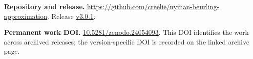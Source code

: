 \par\textbf{Repository and release.} \url{https://github.com/creelie/nyman-beurling-approximation}. Release \href{https://github.com/creelie/nyman-beurling-approximation/releases/tag/v3.0.1}{v3.0.1}.
\par\textbf{Permanent work DOI.} \href{https://doi.org/10.5281/zenodo.24054093}{10.5281/zenodo.24054093}. This DOI identifies the work across archived releases; the version-specific DOI is recorded on the linked archive page.
